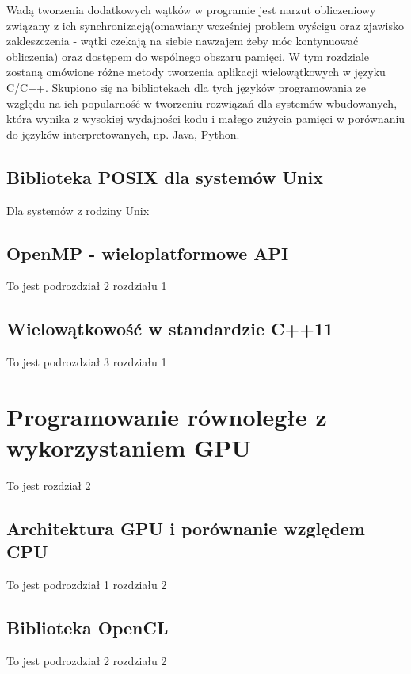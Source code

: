 \documentclass[document.tex]{subfiles}
\begin{document}
Wadą tworzenia dodatkowych wątków w programie jest narzut obliczeniowy
związany z ich synchronizacją(omawiany wcześniej problem wyścigu oraz zjawisko zakleszczenia - wątki czekają na siebie nawzajem żeby móc kontynuować obliczenia) oraz dostępem do wspólnego obszaru pamięci.\cite{POSIX_Butenhof}\cite{C++_Stroustrup}
\indent W tym rozdziale zostaną omówione różne metody tworzenia aplikacji
wielowątkowych w języku C/C++. Skupiono się na bibliotekach dla tych języków
programowania ze względu na ich popularność w tworzeniu rozwiązań dla systemów wbudowanych, która wynika z wysokiej wydajności kodu i małego zużycia pamięci w porównaniu do języków interpretowanych, np. Java, Python.\cite{C++_Stroustrup}\cite{C_King}
\subsection{Biblioteka POSIX dla systemów Unix}
\indent Dla systemów z rodziny Unix
	
	\subsection{OpenMP - wieloplatformowe API}
	To jest podrozdział 2 rozdziału 1
	\subsection{Wielowątkowość w standardzie C++11}
	To jest podrozdział 3 rozdziału 1
\section{Programowanie równoległe z wykorzystaniem GPU}
	To jest rozdział 2
	\subsection{Architektura GPU i porównanie względem CPU}
	To jest podrozdział 1 rozdziału 2
	\subsection{Biblioteka OpenCL}
	To jest podrozdział 2 rozdziału 2
\end{document}
